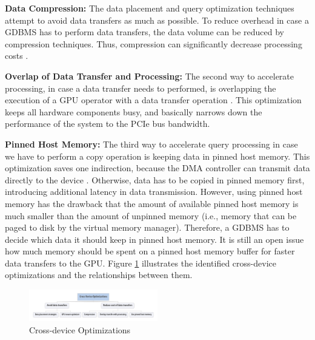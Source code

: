 \documentclass[twocolumn]{article}
\begin{document}
\noindent
\textbf{Data Compression:}
The data placement and query optimization techniques attempt to avoid data transfers as much as possible. To reduce overhead in case a GDBMS has to perform data transfers, the data volume can be reduced by compression techniques. 
Thus, compression can significantly decrease processing costs \cite{Yuan:2013}. 

\noindent
\textbf{Overlap of Data Transfer and Processing:} 
The second way to accelerate processing, in case a data transfer needs to performed, is overlapping the execution of a GPU operator with a data transfer operation \cite{Yuan:2013}. This optimization keeps all hardware components busy, and basically narrows down the performance of the system to the PCIe bus bandwidth.

\noindent
\textbf{Pinned Host Memory:} 
The third way to accelerate query processing in case we have to perform a copy operation is keeping data in pinned host memory. This optimization saves one indirection, because the DMA controller can transmit data directly to the device \cite{Yuan:2013}. Otherwise, data has to be copied in pinned memory first, introducing additional latency in data transmission. However, using pinned host memory has the drawback that the amount of available pinned host memory is much smaller than the amount of unpinned memory (i.e., memory that can be paged to disk by the virtual memory manager). Therefore, a GDBMS has to decide which data it should keep in pinned host memory. It is still an open issue how much memory should be spent on a pinned host memory buffer for faster data transfers to the GPU.
Figure \ref{fig:cross-device-tree} illustrates the identified cross-device optimizations and the relationships between them.

\begin{figure}[htb]
        \centering
        \includegraphics[width=0.5\textwidth]{cross-device-tree.pdf}
        \caption{Cross-device Optimizations}
        \label{fig:cross-device-tree}
\end{figure}
\end{document}
